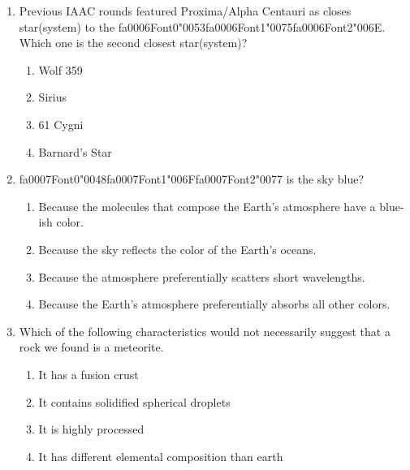\documentclass[12pt]{article}
\begin{document}
\begin{enumerate}[label=\arabic*.]
\begin{enumerate}[label=(\alph*)]
    \item because the Moon's rotational and orbital periods are equal
\end{enumerate}
\item Previous IAAC rounds featured Proxima/Alpha Centauri as closes star(system) to the {\csname fa0006Font0\endcsname\char"0053}{\csname fa0006Font1\endcsname\char"0075}{\csname fa0006Font2\endcsname\char"006E}.
Which one is the second closest star(system)?
\begin{enumerate}[label=(\alph*)]
    \item Wolf 359
    \item Sirius
    \item 61 Cygni
    \item Barnard's Star
\end{enumerate}
\item {\csname fa0007Font0\endcsname\char"0048}{\csname fa0007Font1\endcsname\char"006F}{\csname fa0007Font2\endcsname\char"0077} is the sky blue?
\begin{enumerate}[label=(\alph*)]
    \item Because the molecules that compose the Earth's atmosphere have a blue-ish color.
    \item Because the sky reflects the color of the Earth's oceans.
    \item Because the atmosphere preferentially scatters short wavelengths.
    \item Because the Earth's atmosphere preferentially absorbs all other colors.
\end{enumerate}
\item Which of the following characteristics would not necessarily suggest that a rock we found
is a meteorite.
\begin{enumerate}[label=(\alph*)]
    \item It has a fusion crust
    \item It contains solidified spherical droplets
    \item It is highly processed
    \item It has different elemental composition than earth
\end{enumerate}
\end{enumerate}
\end{document}
